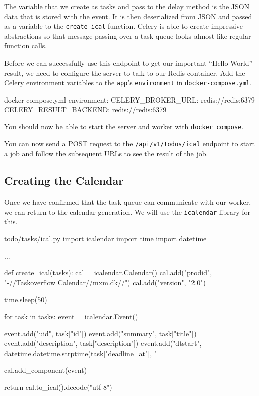 \documentclass{csse4400}
\begin{document}
The variable that we create as tasks and pass to the delay method is the JSON data that is stored with the event.
It is then deserialized from JSON and passed as a variable to the \texttt{create\_ical} function.
Celery is able to create impressive abstractions so that message passing over a task queue looks almost like regular function calls.

Before we can successfully use this endpoint to get our important ``Hello World'' result,
we need to configure the server to talk to our Redis container.
Add the Celery environment variables to the \texttt{app}'s \texttt{environment} in \texttt{docker-compose.yml}.
%
\begin{code}[numbers=none]{docker-compose.yml}
  environment:
    CELERY_BROKER_URL: redis://redis:6379
    CELERY_RESULT_BACKEND: redis://redis:6379
\end{code}

You should now be able to start the server and worker with \texttt{docker compose}.


You can now send a POST request to the \texttt{/api/v1/todos/ical} endpoint
to start a job and follow the subsequent URLs to see the result of the job.

\subsection{Creating the Calendar}

Once we have confirmed that the task queue can communicate with our worker,
we can return to the calendar generation.
We will use the \texttt{icalendar} library for this.


\vspace{-2em}
\begin{code}[language=python,numbers=none]{todo/tasks/ical.py}
import icalendar
import time
import datetime

...

def create_ical(tasks):
    cal = icalendar.Calendar()
    cal.add("prodid", "-//Taskoverflow Calendar//mxm.dk//")
    cal.add("version", "2.0")

    time.sleep(50)

    for task in tasks:
        event = icalendar.Event()
        
        event.add("uid", task["id"])
        event.add("summary", task["title"])
        event.add("description", task["description"])
        event.add("dtstart", datetime.datetime.strptime(task["deadline_at"], "%

        cal.add_component(event)

    return cal.to_ical().decode("utf-8")
\end{code}
\end{document}
